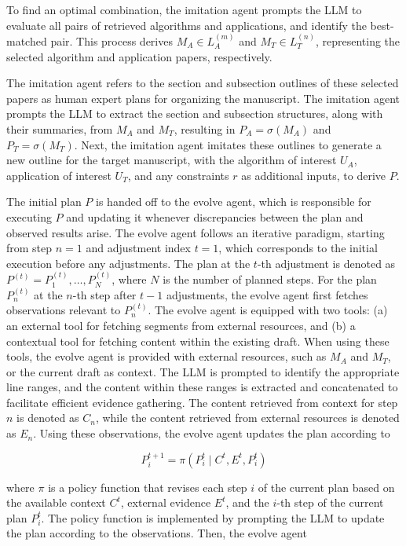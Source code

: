 \documentclass[manuscript,review,anonymous]{acmart}
\begin{document}
To find an optimal combination, the imitation agent prompts the LLM to evaluate all pairs of retrieved algorithms and applications, and identify the best-matched pair. This process derives $M_A \in {L_A^{(m)}}$ and $M_T \in {L_T^{(n)}}$, representing the selected algorithm and application papers, respectively.

The imitation agent refers to the section and subsection outlines of these selected papers as human expert plans for organizing the manuscript. The imitation agent prompts the LLM to extract the section and subsection structures, along with their summaries, from $M_A$ and $M_T$, resulting in $P_A = \sigma(M_A)$ and $P_T = \sigma(M_T)$. Next, the imitation agent imitates these outlines to generate a new outline for the target manuscript, with the algorithm of interest $U_A$, application of interest $U_T$, and any constraints $r$ as additional inputs, to derive $P$.

The initial plan $P$ is handed off to the evolve agent, which is responsible for executing $P$ and updating it whenever discrepancies between the plan and observed results arise. The evolve agent follows an iterative paradigm, starting from step $n = 1$ and adjustment index $t = 1$, which corresponds to the initial execution before any adjustments. The plan at the $t$-th adjustment is denoted as $P^{(t)} = {P_1^{(t)}, \ldots, P_N^{(t)}}$, where $N$ is the number of planned steps. For the plan $P_n^{(t)}$ at the $n$-th step after $t-1$ adjustments, the evolve agent first fetches observations relevant to $P_n^{(t)}$. The evolve agent is equipped with two tools: (a) an external tool for fetching segments from external resources, and (b) a contextual tool for fetching content within the existing draft. When using these tools, the evolve agent is provided with external resources, such as $M_A$ and $M_T$, or the current draft as context. The LLM is prompted to identify the appropriate line ranges, and the content within these ranges is extracted and concatenated to facilitate efficient evidence gathering. The content retrieved from context for step $n$ is denoted as $C_n$, while the content retrieved from external resources is denoted as $E_n$. Using these observations, the evolve agent updates the plan according to

\begin{equation}
P_i^{t+1} = \pi(P_i^t \mid C^t, E^t, P_i^t)
\end{equation}

where $\pi$ is a policy function that revises each step $i$ of the current plan based on the available context $C^t$, external evidence $E^t$, and the $i$-th step of the current plan $P_i^t$. The policy function is implemented by prompting the LLM to update the plan according to the observations. Then, the evolve agent 
\end{document}
